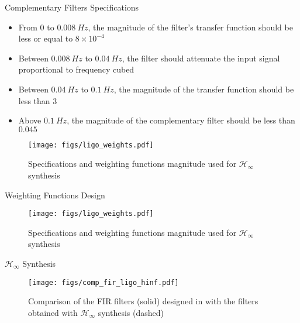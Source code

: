 \documentclass[t]{clean-beamer}
\begin{document}
\begin{frame}[label={sec:org1f8bc6e}]{Complementary Filters Specifications}
\label{sec:ligo_specifications}
\begin{itemize}
\item From \(0\) to \(\SI{0.008}{Hz}\), the magnitude of the filter's transfer function should be less or equal to \(8 \times 10^{-4}\)
\item Between \(\SI{0.008}{Hz}\) to \(\SI{0.04}{Hz}\), the filter should attenuate the input signal proportional to frequency cubed
\item Between \(\SI{0.04}{Hz}\) to \(\SI{0.1}{Hz}\), the magnitude of the transfer function should be less than \(3\)
\item Above \(\SI{0.1}{Hz}\), the magnitude of the complementary filter should be less than \(0.045\)
\end{itemize}

\begin{figure}[htbp]
\centering
\texttt{[image: figs/ligo\_weights.pdf]}
\caption{\label{fig:ligo_weights}
Specifications and weighting functions magnitude used for \(\mathcal{H}_\infty\) synthesis}
\end{figure}
\end{frame}

\begin{frame}[label={sec:org305a6e1}]{Weighting Functions Design}
\label{sec:ligo_weights}

\begin{figure}[htbp]
\centering
\texttt{[image: figs/ligo\_weights.pdf]}
\caption{\label{fig:ligo_weights}
Specifications and weighting functions magnitude used for \(\mathcal{H}_\infty\) synthesis}
\end{figure}
\end{frame}

\begin{frame}[label={sec:org1aa43d2}]{\(\mathcal{H}_\infty\) Synthesis}
\label{sec:ligo_results}

\begin{figure}[htbp]
\centering
\texttt{[image: figs/comp\_fir\_ligo\_hinf.pdf]}
\caption{\label{fig:comp_fir_ligo_hinf}
Comparison of the FIR filters (solid) designed in \cite{hua05_low_ligo} with the filters obtained with \(\mathcal{H}_\infty\) synthesis (dashed)}
\end{figure}
\end{frame}
\end{document}
